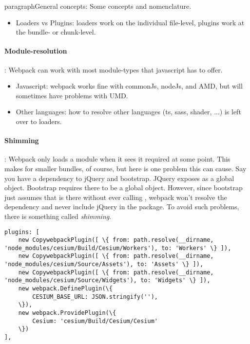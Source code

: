 paragraph{General concepts}: Some concepts and nomenclature.

\begin{itemize}
    \item Loaders vs Plugins: loaders work on the individual file-level, plugins work at the bundle- or chunk-level.
\end{itemize}

\paragraph{Module-resolution}: Webpack can work with most module-types that javascript has to offer.

\begin{itemize}
    \item Javascript: webpack works fine with commonJs, nodeJs, and AMD, but will sometimes have problems with UMD.
    \item Other languages: how to resolve other languages (ts, sass, shader, ...) is left over to loaders.
\end{itemize}

\paragraph{Shimming}: Webpack only loads a module when it sees it required at some point. This makes for smaller bundles, of course, but here is one problem this can cause. Say you have a dependency to jQuery and bootstrap. JQuery exposes  as a global object. Bootstrap requires there to be a global  object. However, since bootstrap just assumes that  is there without ever calling , webpack won't resolve the dependency and never include jQuery in the package. To avoid such problems, there is something called \emph{shimming}. 

\begin{lstlisting}
plugins: [
    new CopywebpackPlugin([ \{ from: path.resolve(__dirname, 'node_modules/cesium/Build/Cesium/Workers'), to: 'Workers' \} ]),
    new CopywebpackPlugin([ \{ from: path.resolve(__dirname, 'node_modules/cesium/Source/Assets'), to: 'Assets' \} ]),
    new CopywebpackPlugin([ \{ from: path.resolve(__dirname, 'node_modules/cesium/Source/Widgets'), to: 'Widgets' \} ]),
    new webpack.DefinePlugin(\{
        CESIUM_BASE_URL: JSON.stringify(''),
    \}),
    new webpack.ProvidePlugin(\{
        Cesium: 'cesium/Build/Cesium/Cesium'
    \})
],
\end{lstlisting}

